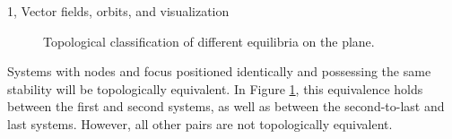 \begin{task}{1, Vector fields, orbits, and visualization}
\begin{figure}[H]
\centering
{}
\caption{Topological classification of different equilibria on the plane.}
\label{Topological classification}
\end{figure}

Systems with nodes and focus positioned identically and possessing the same stability will be topologically equivalent. In Figure \ref{Topological classification}, this equivalence holds between the first and second systems, as well as between the second-to-last and last systems. However, all other pairs are not topologically equivalent.

\end{task}